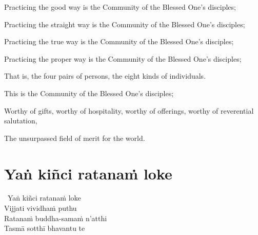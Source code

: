 \begin{english-verses}
  \begin{english-hang-firstline}
    Practicing the good way is the Community of the Blessed One's disciples;
  \end{english-hang-firstline}
  \begin{english-hangtogether-verses}
    Practicing the straight way is the Community of the Blessed One's disciples;
  \end{english-hangtogether-verses}
  \begin{english-hangtogether-verses}
    Practicing the true way is the Community of the Blessed One's disciples;
  \end{english-hangtogether-verses}
  \begin{english-hangtogether-verses}
    Practicing the proper way is the Community of the Blessed One's disciples;
  \end{english-hangtogether-verses}
  \begin{english-hangtogether-verses}
    That is, the four pairs of persons, the eight kinds of individuals.
  \end{english-hangtogether-verses}
  \begin{english-hangtogether-verses}
    This is the Community of the Blessed One's disciples;
  \end{english-hangtogether-verses}
  \begin{english-hangtogether-verses}
    Worthy of gifts, worthy of hospitality, worthy of offerings, worthy of reverential salutation,
  \end{english-hangtogether-verses}
  \begin{english-hangtogether-verses}
    The unsurpassed field of merit for the world.
  \end{english-hangtogether-verses}
\end{english-verses}

\suttaRef{[SN 11.3]}

\section{Yaṅ kiñci ratanaṁ loke}
\label{yan-kinci-ratanam'loke}

\begin{pali-hangtogether}
  \anglebracketleft\ \hspace{-0.5mm}Yaṅ kiñci ratanaṁ loke \hspace{-0.5mm}\anglebracketright\ \\
  Vijjati vividhaṁ puthu\\
  Ratanaṁ buddha-samaṁ n'atthi\\
  Tasmā sotthī bhavantu te
\end{pali-hangtogether}


